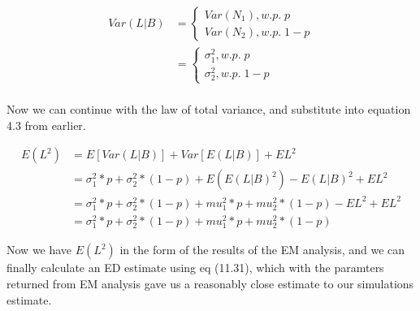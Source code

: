 \documentclass[letter]{article}
\begin{document}
\begin{equation}
\begin{aligned}
	Var(L | B) &=  	\begin{cases}
					Var(N_1),  w.p. \; p \\
					Var(N_2),  w.p. \;1-p
				\end{cases}  \\
		&=		\begin{cases}
					\sigma_1^2,  w.p. \; p \\
					\sigma_2^2,  w.p. \;1-p
				\end{cases}  \\
\end{aligned}
\end{equation}

Now we can continue with the law of total variance, and substitute into equation 4.3 from earlier.

\begin{equation}
\begin{aligned}
	E(L^2) &=  E[Var(L | B)] + Var[E(L|B)] + EL^2 \\
		&= \sigma_1^2 * p + \sigma_2^2 * (1-p) + E(E(L|B)^2) -  E(L|B)^2 + EL^2 \\
		&= \sigma_1^2 * p + \sigma_2^2 * (1-p) + mu_1^2 * p + mu_2^2 * (1-p) -  EL^2 + EL^2 \\
		&= \sigma_1^2 * p + \sigma_2^2 * (1-p) + mu_1^2 * p + mu_2^2 * (1-p)
\end{aligned}
\end{equation}

Now we have $E(L^2)$ in the form of the results of the EM analysis, and we can finally calculate an ED estimate using eq (11.31), which with the paramters returned from EM analysis gave us  a reasonably close estimate to our simulations estimate.
\end{document}
